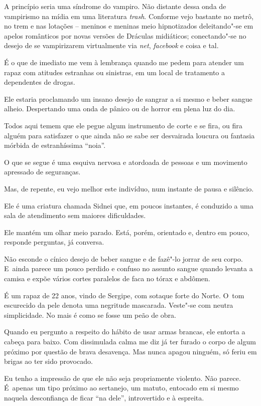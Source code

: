  

A princípio seria uma síndrome do vampiro. Não distante dessa onda de
vampirismo na mídia em uma literatura \emph{trash}. Conforme vejo
bastante no metrô, no trem e nas lotações -- meninos e meninas meio
hipnotizados deleitando"-se em apelos românticos por novas versões de
Dráculas midiáticos; conectando"-se no desejo de se vampirizarem
virtualmente via \emph{net}, \emph{facebook} e coisa e tal.

É o que de imediato me vem à lembrança quando me pedem para atender um
rapaz com atitudes estranhas ou sinistras, em um local de tratamento a
dependentes de drogas.

Ele estaria proclamando um insano desejo de sangrar a si mesmo e beber
sangue alheio. Despertando uma onda de pânico ou de horror em plena luz
do dia.

Todos aqui temem que ele pegue algum instrumento de corte e se fira, ou
fira alguém para satisfazer o que ainda não se sabe ser desvairada
loucura ou fantasia mórbida de estranhíssima ``noia''.

O que se segue é uma esquiva nervosa e atordoada de pessoas e um
movimento apressado de seguranças.

Mas, de repente, eu vejo melhor este indivíduo, num instante de pausa e
silêncio.

Ele é uma criatura chamada Sidnei que, em poucos instantes, é conduzido
a uma sala de atendimento sem maiores dificuldades.

Ele mantém um olhar meio parado. Está, porém, orientado e, dentro em
pouco, responde perguntas, já conversa.

Não esconde o cínico desejo de beber sangue e de fazê"-lo jorrar de seu
corpo. E~ainda parece um pouco perdido e confuso no assunto sangue
quando levanta a camisa e expõe vários cortes paralelos de faca no tórax
e abdômen.

É um rapaz de 22 anos, vindo de Sergipe, com sotaque forte do Norte. O~tom escurecido da pele denota uma negritude mascarada. Veste"-se com
neutra simplicidade. No mais é como se fosse um peão de obra.

Quando eu pergunto a respeito do hábito de usar armas brancas, ele
entorta a cabeça para baixo. Com dissimulada calma me diz já ter furado
o corpo de algum próximo por questão de brava desavença. Mas nunca
apagou ninguém, só feriu em brigas ao ter sido provocado.

Eu tenho a impressão de que ele não seja propriamente violento. Não
parece. É~apenas um tipo próximo ao sertanejo, um matuto, entocado em si
mesmo naquela desconfiança de ficar ``na dele'', introvertido e à
espreita.

